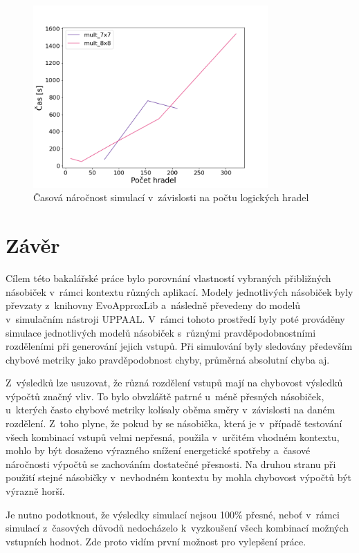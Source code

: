 \begin{figure}[H]
    \centering
    \includegraphics[width=0.8\textwidth]{obrazky-figures/scalability_time.png}
    \caption{Časová náročnost simulací v~závislosti na počtu logických hradel}
    \label{fig:scalability_time}
\end{figure}

\chapter{Závěr}
\label{zaver}
Cílem této bakalářské práce bylo porovnání vlastností vybraných přibližných násobiček v~rámci kontextu různých aplikací. Modely jednotlivých násobiček byly převzaty z~knihovny EvoApproxLib \cite{circuit_library} a~následně převedeny do modelů v~simulačním nástroji UPPAAL. V~rámci tohoto prostředí byly poté prováděny simulace jednotlivých modelů násobiček s~různými pravděpodobnostními rozděleními při generování jejich vstupů. Při simulování byly sledovány především chybové metriky jako pravděpodobnost chyby, průměrná absolutní chyba aj.

Z~výsledků lze usuzovat, že různá rozdělení vstupů mají na chybovost výsledků výpočtů značný vliv. To bylo obvzláště patrné u~méně přesných násobiček, u~kterých často chybové metriky kolísaly oběma směry v~závislosti na daném rozdělení. Z~toho plyne, že pokud by se násobička, která je v~případě testování všech kombinací vstupů velmi nepřesná, použila v~určitém vhodném kontextu, mohlo by být dosaženo výrazného snížení energetické spotřeby a~časové náročnosti výpočtů se zachováním dostatečné přesnosti. Na druhou stranu při použití stejné násobičky v~nevhodném kontextu by mohla chybovost výpočtů být výrazně horší.

Je nutno podotknout, že výsledky simulací nejsou 100\% přesné, neboť v~rámci simulací z~časových důvodů nedocházelo k~vyzkoušení všech kombinací možných vstupních hodnot. Zde proto vidím první možnost pro vylepšení práce.

